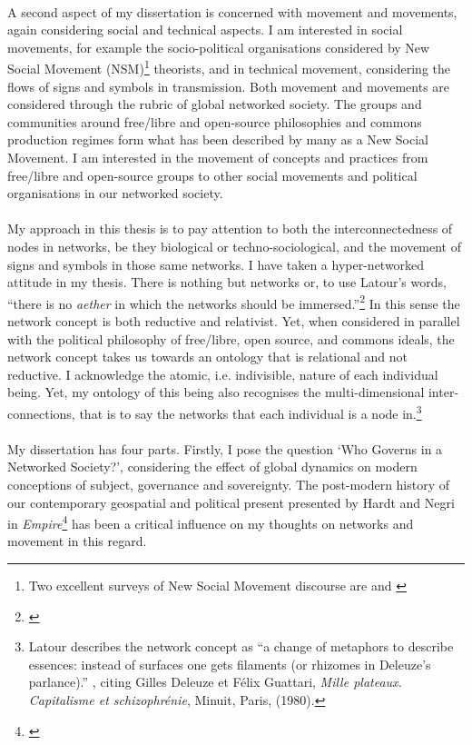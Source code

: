\documentclass[11pt,titlepage]{book}
\begin{document}
\paragraph{}A second aspect of my dissertation is concerned with movement and movements, again considering social and technical aspects. I am interested in social movements, for example the socio-political organisations considered by New Social Movement (NSM)\footnote{Two excellent surveys of New Social Movement discourse are \cite{daltonetal1990} and \cite{Porta:2006kx}} theorists, and in technical movement, considering the flows of signs and symbols in transmission. Both movement and movements are considered through the rubric of global networked society. The groups and communities around free/libre and open-source philosophies and commons production regimes form what has been described by many as a New Social Movement. I am interested in the movement of concepts and practices from free/libre and open-source groups to other social movements and political organisations in our networked society.

\paragraph{}My approach in this thesis is to pay attention to both the interconnectedness of nodes in networks, be they biological or techno-sociological, and the movement of signs and symbols in those same networks. I have taken a hyper-networked attitude in my thesis. There is nothing but networks or, to use Latour's words, ``there is no \textit{aether} in which the networks should be immersed.''\footnote{\cite{latour:1998ant1}} In this sense the network concept is both reductive and relativist. Yet, when considered in parallel with the political philosophy of free/libre, open source, and commons ideals, the network concept takes us towards an ontology that is relational and not reductive. I acknowledge the atomic, i.e. indivisible, nature of each individual being. Yet, my ontology of this being also recognises the multi-dimensional inter-connections, that is to say the networks that each individual is a node in.\footnote{Latour describes the network concept as  ``a change of metaphors to describe essences: instead of surfaces one gets filaments (or rhizomes in Deleuze's parlance).'' \cite{latour:1998ant1}, citing Gilles Deleuze et F\'{e}lix Guattari, \textit{Mille plateaux. Capitalisme et schizophr\'{e}nie}, Minuit, Paris, (1980).}

\paragraph{}My dissertation has four parts. Firstly, I pose the question `Who Governs in a Networked Society?', considering the effect of global dynamics on modern conceptions of subject, governance and sovereignty. The post-modern history of our contemporary geospatial and political present presented by Hardt and Negri in \textit{Empire}\footnote{\cite{Hardt:2001jl}} has been a critical influence on my thoughts on networks and movement in this regard.
\end{document}
